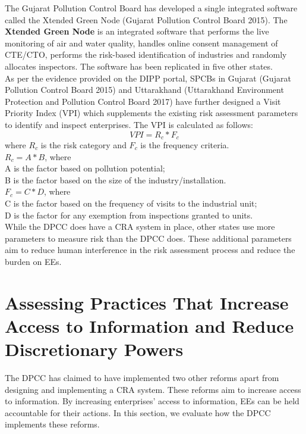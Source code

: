 \documentclass[a4paper, 12pt]{article}
\begin{document}
	The Gujarat Pollution Control Board has developed a single integrated software called the Xtended Green Node (Gujarat Pollution Control Board 2015). The \textbf{Xtended Green Node} is an integrated software that performs the live monitoring of air and water quality, handles online consent management of CTE/CTO, performs the risk-based identification of industries and randomly allocates inspectors. The software has been replicated in five other states. \\
	
	As per the evidence provided on the DIPP portal, SPCBs in Gujarat (Gujarat Pollution Control Board 2015) and Uttarakhand (Uttarakhand Environment Protection and Pollution Control Board 2017) have further designed a Visit Priority Index (VPI) which supplements the existing risk assessment parameters to identify and inspect enterprises. The VPI is calculated as follows: $$VPI = R_c *F_c$$ where $R_c$ is the risk category and $F_c$ is the frequency criteria. \\
	
	$R_c = A*B$, where \\
	
	A is the factor based on pollution potential; \\
	
	B is the factor based on the size of the industry/installation. \\
	
	$F_c = C*D$, where \\
	
	C is the factor based on the frequency of visits to the industrial unit; \\
	
	D is the factor for any exemption from inspections granted to units. \\
	
	While the DPCC does have a CRA system in place, other states use more parameters to measure risk than the DPCC does. These additional parameters aim to reduce human interference in the risk assessment process and reduce the burden on EEs. \\
	
	\section{Assessing Practices That Increase Access to Information and Reduce Discretionary Powers}
	
	The DPCC has claimed to have implemented two other reforms apart from designing and implementing a CRA system. These reforms aim to increase access to information. By increasing enterprises’ access to information, EEs can be held accountable for their actions. In this section, we evaluate how the DPCC implements these reforms. \\
	
\end{document}
